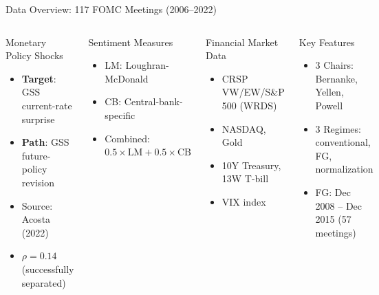 \documentclass[aspectratio=169, 11pt]{beamer}
\begin{document}
\begin{frame}{Data Overview: 117 FOMC Meetings (2006--2022)}
\begin{columns}[T]
\begin{ablock}{Monetary Policy Shocks}
\begin{itemize}
  \item \textbf{Target}: GSS current-rate surprise
  \item \textbf{Path}: GSS future-policy revision
  \item Source: Acosta (2022)
  \item $\rho = 0.14$ (successfully separated)
\end{itemize}
\end{ablock}
\vspace{0.2em}
\begin{aexampleblock}{Sentiment Measures}
\begin{itemize}
  \item LM: Loughran-McDonald
  \item CB: Central-bank-specific
  \item Combined: $0.5 \times \text{LM} + 0.5 \times \text{CB}$
\end{itemize}
\end{aexampleblock}

\begin{ablock}{Financial Market Data}
\begin{itemize}
  \item CRSP VW/EW/S\&P 500 (WRDS)
  \item NASDAQ, Gold
  \item 10Y Treasury, 13W T-bill
  \item VIX index
\end{itemize}
\end{ablock}
\vspace{0.2em}
\begin{aalertblock}{Key Features}
\begin{itemize}
  \item 3 Chairs: Bernanke, Yellen, Powell
  \item 3 Regimes: conventional, FG, normalization
  \item FG: Dec 2008 -- Dec 2015 (57 meetings)
\end{itemize}
\end{aalertblock}
\end{columns}
\end{frame}
\end{document}
